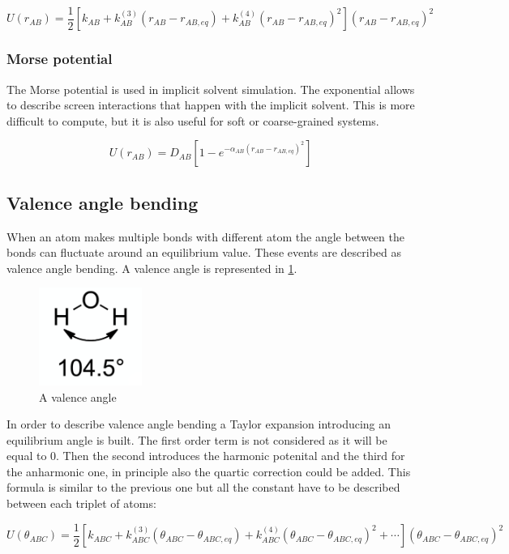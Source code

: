 		$$U(r_{AB}) = \frac{1}{2}[k_{AB}+k^{(3)}_{AB}(r_{AB}-r_{AB, eq}) + k^{(4)}_{AB}(r_{AB}-r_{AB,eq})^2](r_{AB}-r_{AB, eq})^2$$

		\subsubsection{Morse potential}
		The Morse potential is used in implicit solvent simulation.
		The exponential allows to describe screen interactions that happen with the implicit solvent.
		This is more difficult to compute, but it is also useful for soft or coarse-grained systems.

		$$U(r_{AB}) = D_{AB}\left[1-e^{-\alpha_{AB}(r_{AB}-r_{AB,eq})^2}\right]$$

	\subsection{Valence angle bending}
	When an atom makes multiple bonds with different atom the angle between the bonds can fluctuate around an equilibrium value.
	These events are described as valence angle bending.
	A valence angle is represented in \ref{fig:valence-angle-bending}.

	\begin{figure}[H]
		\centering
		\includegraphics[width=0.3\textwidth]{valence-angle-bending}
		\caption{A valence angle}
		\label{fig:valence-angle-bending}
	\end{figure}

	In order to describe valence angle bending a Taylor expansion introducing an equilibrium angle is built.
	The first order term is not considered as it will be equal to $0$.
	Then the second introduces the harmonic potenital and the third for the anharmonic one, in principle also the quartic correction could be added.
	This formula is similar to the previous one but all the constant have to be described between each triplet of atoms:

	$$U(\theta_{ABC}) = \frac{1}{2}[k_{ABC}+k^{(3)}_{ABC}(\theta_{ABC}-\theta_{ABC,eq})+k^{(4)}_{ABC}(\theta_{ABC}-\theta_{ABC,eq})^2+\cdots](\theta_{ABC}-\theta_{ABC, eq})^2$$

